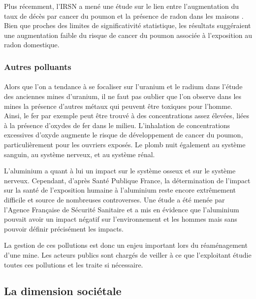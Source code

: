 \documentclass{article}
\begin{document}
Plus récemment, l’IRSN a mené une étude sur le lien entre l’augmentation du taux de décès par cancer du poumon et la présence de radon dans les maisons \cite{darby_radon_2005}. Bien que proches des limites de significativité statistique, les résultats suggéraient une augmentation faible du risque de cancer du poumon associée à l’exposition au radon  domestique.

\subsubsection{Autres polluants}

\paragraph{} Alors que l’on a tendance à se focaliser sur l’uranium et le radium dans l’étude des anciennes mines d’uranium, il ne faut pas oublier que l’on observe dans les mines la présence d'autres métaux qui peuvent être toxiques pour l’homme. Ainsi, le fer par exemple peut être trouvé à des concentrations assez élevées, liées à la présence d'oxydes de fer dans le milieu. L'inhalation de concentrations excessives d'oxyde augmente le risque de développement de cancer du poumon, particulièrement pour les ouvriers exposés. Le plomb nuit également au système sanguin, au système nerveux, et au système rénal.

L’aluminium a quant à lui un impact sur le système osseux et sur le système nerveux. Cependant, d’après Santé Publique France, la détermination de l'impact sur la santé de l'exposition humaine à l'aluminium reste encore extrêmement difficile et source de nombreuses controverses. Une étude a été menée par l’Agence Française de Sécurité Sanitaire et a mis en évidence que l’aluminium pouvait avoir un impact négatif sur l’environnement et les hommes mais sans pouvoir définir précisément les impacts.

La gestion de ces pollutions est donc un enjeu important lors du réaménagement d'une mine. Les acteurs publics sont chargés de veiller à ce que l'exploitant étudie toutes ces pollutions et les traite si nécessaire.


\subsection{La dimension sociétale}
\end{document}
